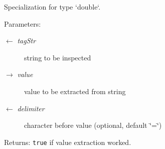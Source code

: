 Specialization for type `double`. 

\begin{Desc}
\item[Parameters:]
\begin{description}
\item[\mbox{$\leftarrow$} {\em tag\-Str}]string to be inspected \item[\mbox{$\rightarrow$} {\em value}]value to be extracted from string \item[\mbox{$\leftarrow$} {\em delimiter}]character before value (optional, default \char`\"{}=\char`\"{})\end{description}
\end{Desc}
\begin{Desc}
\item[Returns:]{\tt true} if value extraction worked. \end{Desc}
